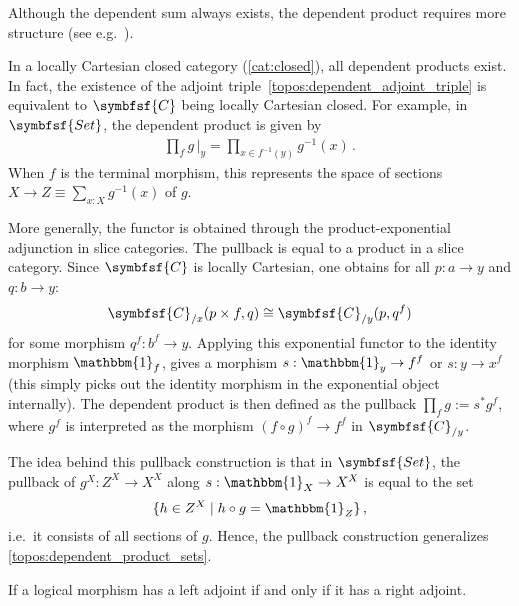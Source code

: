     Although the dependent sum always exists, the dependent product requires more structure (see e.g.~\citet{huang_locally_2022}).
    \begin{property}
        In a locally Cartesian closed category (\cref{cat:closed}), all dependent products exist. In fact, the existence of the adjoint triple~\eqref{topos:dependent_adjoint_triple} is equivalent to $\symbfsf{C}$ being locally Cartesian closed. For example, in $\symbfsf{Set}$, the dependent product is given by
        \begin{gather}
            \label{topos:dependent_product_sets}
            \prod_fg\,\Big|_y=\prod_{x\in f^{-1}(y)}g^{-1}(x)\,.
        \end{gather}
        When $f$ is the terminal morphism, this represents the space of sections $X\rightarrow Z\equiv\sum_{x:X}g^{-1}(x)$ of $g$.

        More generally, the functor is obtained through the product-exponential adjunction in slice categories. The pullback is equal to a product in a slice category. Since $\symbfsf{C}$ is locally Cartesian, one obtains for all $p:a\rightarrow y$ and $q:b\rightarrow y$:
        \begin{gather}
            \symbfsf{C}_{/x}(p\times f,q)\cong\symbfsf{C}_{/y}(p,q^f)
        \end{gather}
        for some morphism $q^f:b^f\rightarrow y$. Applying this exponential functor to the identity morphism $\mathbbm{1}_f$, gives a morphism $s:\mathbbm{1}_y\rightarrow f^f$ or $s:y\rightarrow x^f$ (this simply picks out the identity morphism in the exponential object internally). The dependent product is then defined as the pullback $\prod_fg:=s^*g^f$, where $g^f$ is interpreted as the morphism $(f\circ g)^f\rightarrow f^f$ in $\symbfsf{C}_{/y}$.

        The idea behind this pullback construction is that in $\symbfsf{Set}$, the pullback of $g^X:Z^X\rightarrow X^X$ along $s:\mathbbm{1}_X\rightarrow X^X$ is equal to the set
        \begin{gather}
            \{h\in Z^X\mid h\circ g=\mathbbm{1}_Z\}\,,
        \end{gather}
        i.e.~it consists of all sections of $g$. Hence, the pullback construction generalizes \cref{topos:dependent_product_sets}.
    \end{property}

    \begin{property}
        If a logical morphism has a left adjoint if and only if it has a right adjoint.
    \end{property}

